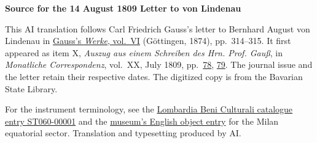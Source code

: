 \clearpage\thispagestyle{empty}
\begin{center}\textbf{Source for the 14 August 1809 Letter to von Lindenau}\end{center}
\noindent This AI translation follows Carl Friedrich Gauss’s letter to Bernhard August von Lindenau in \href{https://gdz.sub.uni-goettingen.de/id/PPN236007467}{Gauss’s \textit{Werke}, vol.~VI} (Göttingen, 1874), pp.~314--315. It first appeared as item X, \textit{Auszug aus einem Schreiben des Hrn. Prof. Gauß}, in \textit{Monatliche Correspondenz}, vol.~XX, July 1809, pp.~\href{https://api.digitale-sammlungen.de/iiif/image/v2/bsb10538610_00084/full/1600,/0/default.jpg}{78}, \href{https://api.digitale-sammlungen.de/iiif/image/v2/bsb10538610_00085/full/1600,/0/default.jpg}{79}. The journal issue and the letter retain their respective dates. The digitized copy is from the Bavarian State Library.
\par\smallskip\noindent For the instrument terminology, see the \href{https://www.lombardiabeniculturali.it/scienza-tecnologia/schede/ST060-00001/}{Lombardia Beni Culturali catalogue entry ST060-00001} and the \href{https://artsandculture.google.com/asset/equatorial-sector/OwGZAfaAaOv35g}{museum’s English object entry} for the Milan equatorial sector. Translation and typesetting produced by AI.
\clearpage
